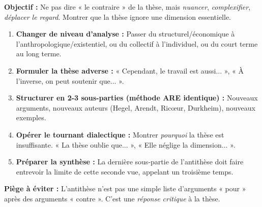 \documentclass[11pt]{article}
\newcommand{\cle}[1]{{\popxbold\color{popdark}#1}}
\begin{document}
\begin{methode}
\textbf{Objectif :} Ne pas dire « le contraire » de la thèse, mais \emph{nuancer}, \emph{complexifier}, \emph{déplacer le regard}. Montrer que la thèse ignore une dimension essentielle.
\begin{enumerate}
    \item \textbf{Changer de niveau d'analyse :} Passer du structurel/économique à l'anthropologique/existentiel, ou du collectif à l'individuel, ou du court terme au long terme.
    \item \textbf{Formuler la thèse adverse :} « Cependant, le travail est aussi... », « À l'inverse, on peut soutenir que... ».
    \item \textbf{Structurer en 2-3 sous-parties (méthode ARE identique) :} Nouveaux arguments, nouveaux auteurs (Hegel, Arendt, Ricœur, Durkheim), nouveaux exemples.
    \item \textbf{Opérer le \cle{tournant dialectique} :} Montrer \emph{pourquoi} la thèse est insuffisante. « La thèse oublie que... », « Elle néglige la dimension... ».
    \item \textbf{Préparer la synthèse :} La dernière sous-partie de l'antithèse doit faire entrevoir la limite de cette seconde vue, appelant un troisième temps.
\end{enumerate}
\textbf{Piège à éviter :} L'antithèse n'est pas une simple liste d'arguments « pour » après des arguments « contre ». C'est une \emph{réponse critique} à la thèse.
\end{methode}
\end{document}
